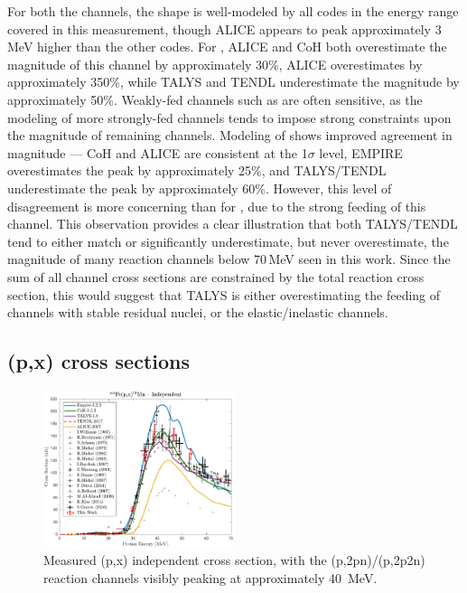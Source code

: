  
For both the   channels, the shape is well-modeled by all codes in the energy range covered in this measurement, though ALICE appears to peak approximately 3\,MeV higher than the other codes.
For , ALICE and CoH both overestimate the magnitude of this channel by approximately 30\%, ALICE overestimates  by approximately 350\%, while TALYS and TENDL underestimate the magnitude by approximately 50\%.
Weakly-fed channels such as  are often sensitive, as the modeling of more strongly-fed channels tends to impose strong constraints upon the magnitude of remaining channels.
Modeling of  shows improved agreement in magnitude --- CoH and ALICE are consistent at the 1$\sigma$ level, EMPIRE overestimates the peak by approximately 25\%, and TALYS/TENDL underestimate the peak by approximately 60\%.
However, this level of disagreement is more concerning than for , due to the strong feeding of this channel.
This observation provides a clear illustration that both TALYS/TENDL tend to either match or significantly underestimate, but never overestimate, the magnitude of many reaction channels below 70\,MeV seen in this work.
Since the sum of all channel cross sections are constrained by the total reaction cross section, this would suggest that TALYS is either overestimating the feeding of channels with stable residual nuclei, or the elastic/inelastic channels.








\subsection{(p,x) cross sections} 


\begin{figure}[h]
 \centering
 \includegraphics[width=0.5\textwidth]{./figures/54Mn.pdf}
 \caption{Measured (p,x) independent cross section, with the (p,2pn)/(p,2p2n) reaction channels visibly peaking at approximately \mbox{40 MeV}.}
 \label{fig:54Mn}
\end{figure}




